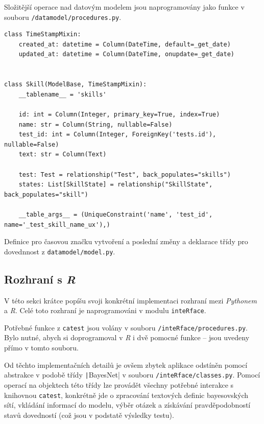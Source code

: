 \documentclass[a4paper,twoside,12pt]{scrbook}
\begin{document}
Složitější operace nad datovým modelem jsou naprogramovány jako funkce v souboru \texttt{/datamodel/procedures.py}.

\begin{listing}
\centering
\begin{verbatim}
class TimeStampMixin:
    created_at: datetime = Column(DateTime, default=_get_date)
    updated_at: datetime = Column(DateTime, onupdate=_get_date)


class Skill(ModelBase, TimeStampMixin):
    __tablename__ = 'skills'

    id: int = Column(Integer, primary_key=True, index=True)
    name: str = Column(String, nullable=False)
    test_id: int = Column(Integer, ForeignKey('tests.id'), nullable=False)
    text: str = Column(Text)

    test: Test = relationship("Test", back_populates="skills")
    states: List[SkillState] = relationship("SkillState", back_populates="skill")

    __table_args__ = (UniqueConstraint('name', 'test_id', name='_test_skill_name_ux'),)
\end{verbatim}
\caption{Definice  pro časovou značku vytvoření a poslední změny a deklarace třídy pro dovednnost z \texttt{datamodel/model.py}.}
\label{lst:SkillDeclaration}
\end{listing}

\subsection{Rozhraní s \textit{R}}
V této sekci krátce popíšu svoji konkrétní implementaci rozhraní mezi \textit{Pythonem} a \textit{R}. Celé toto rozhraní je naprogramováni v modulu \texttt{inteRface}.

Potřebné funkce z \texttt{catest} jsou volány v souboru \texttt{/inteRface/procedures.py}. Bylo nutné, abych si doprogramoval v \textit{R} i dvě pomocné funkce -- jsou uvedeny přímo v tomto souboru.

Od těchto implementačních detailů je ovšem zbytek aplikace odstíněn pomocí abstrakce v podobě třídy \texttt|BayesNet| v souboru \texttt{/inteRface/classes.py}. Pomocí operací na objektech této třídy lze provádět všechny potřebné interakce s knihovnou \texttt{catest}, konkrétně jde o zpracování textových definic bayesovských sítí, vkládání informací do modelu, výběr otázek a získávání pravděpodobností stavů dovedností (což jsou v podstatě výsledky testu).
\end{document}

